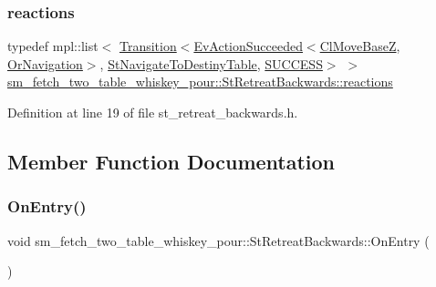 \subsubsection{\texorpdfstring{reactions}{reactions}}
{\footnotesize\ttfamily typedef mpl\+::list$<$ \hyperlink{classsmacc_1_1Transition}{Transition}$<$\hyperlink{structsmacc_1_1default__events_1_1EvActionSucceeded}{Ev\+Action\+Succeeded}$<$\hyperlink{classcl__move__base__z_1_1ClMoveBaseZ}{Cl\+Move\+BaseZ}, \hyperlink{classsm__fetch__two__table__whiskey__pour_1_1OrNavigation}{Or\+Navigation}$>$, \hyperlink{structsm__fetch__two__table__whiskey__pour_1_1StNavigateToDestinyTable}{St\+Navigate\+To\+Destiny\+Table}, \hyperlink{structsmacc_1_1default__transition__tags_1_1SUCCESS}{S\+U\+C\+C\+E\+SS}$>$ $>$ \hyperlink{structsm__fetch__two__table__whiskey__pour_1_1StRetreatBackwards_a1d5438e8b1bfc946206480a52b790238}{sm\+\_\+fetch\+\_\+two\+\_\+table\+\_\+whiskey\+\_\+pour\+::\+St\+Retreat\+Backwards\+::reactions}}



Definition at line 19 of file st\+\_\+retreat\+\_\+backwards.\+h.



\subsection{Member Function Documentation}
\mbox{\label{structsm__fetch__two__table__whiskey__pour_1_1StRetreatBackwards_a8cb7900a7704cb7c38d4c9018c256e58}} 
\subsubsection{\texorpdfstring{On\+Entry()}{OnEntry()}}
{\footnotesize\ttfamily void sm\+\_\+fetch\+\_\+two\+\_\+table\+\_\+whiskey\+\_\+pour\+::\+St\+Retreat\+Backwards\+::\+On\+Entry (\begin{DoxyParamCaption}{ }\end{DoxyParamCaption})\hspace{0.3cm}{\ttfamily [inline]}}



